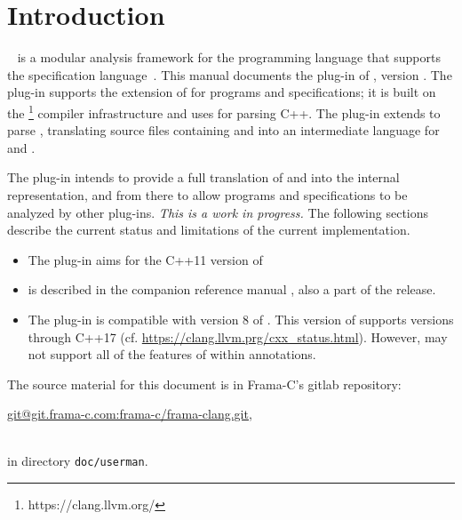 \chapter{Introduction}

\framac~\cite{userman,fac15} is a modular analysis framework for the \C
programming language that supports the \acsl specification
language~\cite{acsl}. This manual documents the \fclang plug-in of \framac,
version \fclangversion. 
The \fclang plug-in supports the \acslpp extension of \acsl for \cpp programs and specifications; 
it is built on the \clang\footnote{https://clang.llvm.org/} compiler infrastructure and uses \clang for 
parsing C++. The plug-in extends \clang to parse \acslpp, translating source files containing \cpp and \acslpp into an intermediate language for \C and \acsl.

The \fclang plug-in intends to provide a full translation of \cpp and \acslpp into the \framac internal representation, and from there to allow \cpp programs and \acslpp specifications to be analyzed by other \framac plug-ins. 
\textit{This is a work in progress.}
The following sections describe the current status and limitations of the current implementation.
\begin{itemize}
	\item The plug-in aims for the C++11 version of \cpp
	\item \acslpp is described in the companion \acslpp reference manual \cite{acslpp}, also a part of the \framac release.
    \item The plug-in is compatible with version 8 of \clang. 
    This version of \clang supports \cpp versions through C++17 
    (cf. \url{https://clang.llvm.prg/cxx_status.html}). 
    However, \fclang may not support all of the features of \cpp within annotations.
\end{itemize}

The source material for this document is in Frama-C's gitlab repository:\\ \centerline{\url{git@git.frama-c.com:frama-c/frama-clang.git},} \\
 in directory \lstinline|doc/userman|.

